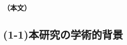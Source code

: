 \documentclass[11pt,a4paper,uplatex,dvipdfmx]{ujarticle} 		%
\newcommand{\研究課題名}{モビリティの時空間調整を活用した電力設備形成構築}
\newcommand{\研究機関名}{名古屋工業大学}
\newcommand{\研究代表者氏名}{中村勇太}
\newcommand{\研究期間の最終元号年度}{10}  %
\begin{document}


\vspace*{1zw}	%
 
\noindent
\noindent
\textbf{（本文）}
\vspace{-1\baselineskip}           %
\subsection*{(1-1)本研究の学術的背景}
\vspace{-0.5\baselineskip}           %
\end{document}
